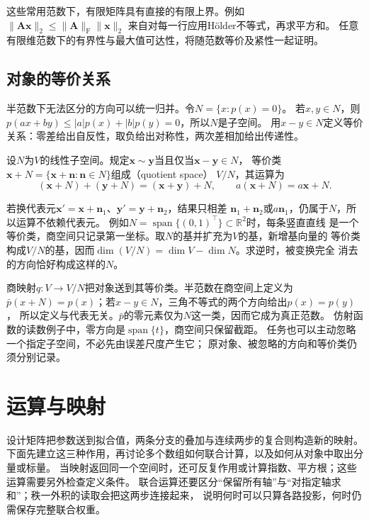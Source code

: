这些常用范数下，有限矩阵具有直接的有限上界。例如
$\lVert\bm A\bm x\rVert_2\leq\lVert\bm A\rVert_{\mathrm F}\lVert\bm x\rVert_2$
来自对每一行应用Hölder不等式，再求平方和。
任意有限维范数下的有界性与最大值可达性，将随范数等价及紧性一起证明。

\subsection{对象的等价关系}
\label{sec:linear-algebra-equivalence-relations}

半范数下无法区分的方向可以统一归并。令$N=\{x:p(x)=0\}$。
若$x,y\in N$，则$p(ax+by)\leq |a|p(x)+|b|p(y)=0$，所以$N$是子空间。
用$x-y\in N$定义等价关系：零差给出自反性，取负给出对称性，两次差相加给出传递性。
\begin{definition}[线性空间的商空间]
\label{def:linear-algebra-quotient-space}
设$N$为$V$的线性子空间。规定$\bm x\sim\bm y$当且仅当$\bm x-\bm y\in N$，
等价类$\bm x+N=\{\bm x+\bm n:\bm n\in N\}$组成（quotient space）
$V/N$，其运算为
\[
 (\bm x+N)+(\bm y+N)=(\bm x+\bm y)+N,\qquad
 a(\bm x+N)=a\bm x+N.
\]
\end{definition}
若换代表元$\bm x'=\bm x+\bm n_1$、$\bm y'=\bm y+\bm n_2$，结果只相差
$\bm n_1+\bm n_2$或$a\bm n_1$，仍属于$N$，所以运算不依赖代表元。
例如$N=\operatorname{span}\{(0,1)^{\top}\}\subset\mathbb R^2$时，每条竖直直线
是一个等价类，商空间只记录第一坐标。取$N$的基并扩充为$V$的基，新增基向量的
等价类构成$V/N$的基，因而$\dim(V/N)=\dim V-\dim N$。求逆时，被变换完全
消去的方向恰好构成这样的$N$。



商映射$q:V\to V/N$把对象送到其等价类。半范数在商空间上定义为
$\bar p(x+N)=p(x)$；若$x-y\in N$，三角不等式的两个方向给出$p(x)=p(y)$，
所以定义与代表无关。$\bar p$的零元素仅为$N$这一类，因而它成为真正范数。
仿射函数的读数例子中，零方向是$\operatorname{span}\{t\}$，商空间只保留截距。
任务也可以主动忽略一个指定子空间，不必先由误差尺度产生它；
原对象、被忽略的方向和等价类仍须分别记录。

\section{运算与映射}
\label{sec:linear-algebra-matrices-linear-maps}

设计矩阵把参数送到拟合值，两条分支的叠加与连续两步的复合则构造新的映射。
下面先建立这三种作用，再讨论多个数组如何联合计算，以及如何从对象中取出分量或标量。
当映射返回同一个空间时，还可反复作用或计算指数、平方根；这些运算需要另外检查定义条件。
联合运算还要区分“保留所有轴”与“对指定轴求和”；秩一外积的读取会把这两步连接起来，
说明何时可以只算各路投影，何时仍需保存完整联合权重。

